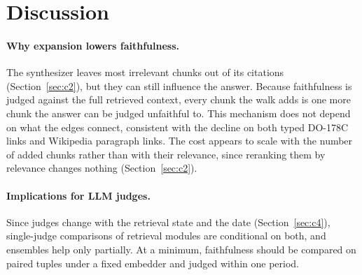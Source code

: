 \section{Discussion}
\label{sec:discussion}

\paragraph{Why expansion lowers faithfulness.}
The synthesizer leaves most irrelevant chunks out of its citations
(Section~\ref{sec:c2}), but they can still influence the answer. Because faithfulness is judged
against the full retrieved context, every chunk the walk adds is one
more chunk the answer can be judged unfaithful to. This mechanism does not depend on what the edges connect, consistent
with the decline on both typed DO-178C links and Wikipedia paragraph
links. The cost appears to scale with the number of added chunks
rather than with their relevance, since reranking them by relevance
changes nothing (Section~\ref{sec:c2}).

\paragraph{Implications for LLM judges.}
Since judges change with the retrieval state and the date
(Section~\ref{sec:c4}), single-judge comparisons of retrieval modules
are conditional on both, and ensembles help only partially. At a
minimum, faithfulness should be compared on paired tuples under a fixed
embedder and judged within one period.

